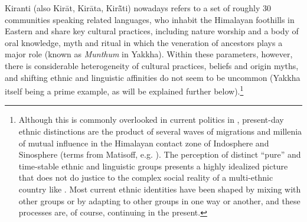 Kiranti (also Kirāt, Kirāta, Kirā̃ti) nowadays refers to a set of roughly 30 communities speaking related languages, who inhabit the Himalayan foothills in Eastern  and share key cultural practices, including nature worship and a body of oral knowledge, myth and ritual in which the veneration of ancestors plays a major role (known as \emph{Munthum} in Yakkha). Within these parameters, however, there is considerable heterogeneity of cultural practices, beliefs and origin myths, and shifting ethnic and linguistic affinities do not seem to be uncommon (Yakkha itself being a prime example, as will be explained further below).\footnote{Although this is commonly overlooked in current politics in ,  present-day ethnic distinctions are the product of several waves of migrations and millenia of mutual influence in the Himalayan contact zone of Indosphere and Sinosphere (terms from Matisoff, e.g. \citet{Matisoff1990_On}). The perception of distinct “pure” and time-stable ethnic and linguistic groups presents a highly idealized picture that does not do justice to the complex social reality of a multi-ethnic country like . Most current ethnic identities have been shaped by mixing with other groups or by adapting to other groups in one way or another, and these processes are, of course, continuing in the present.} 

